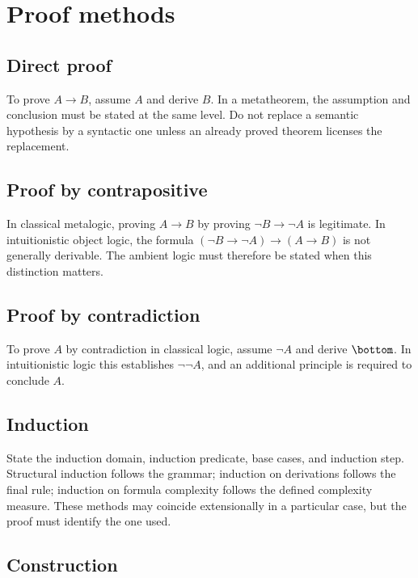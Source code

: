 \section{Proof methods}
\label{sec:writing-foundations-04}

\subsection{Direct proof}

To prove \(A\to B\), assume \(A\) and derive \(B\).  In a metatheorem, the
assumption and conclusion must be stated at the same level.  Do not replace a
semantic hypothesis by a syntactic one unless an already proved theorem
licenses the replacement.

\subsection{Proof by contrapositive}

In classical metalogic, proving \(A\to B\) by proving
\(\neg B\to\neg A\) is legitimate.  In intuitionistic object logic, the
formula \((\neg B\to\neg A)\to(A\to B)\) is not generally derivable.  The
ambient logic must therefore be stated when this distinction matters.

\subsection{Proof by contradiction}

To prove \(A\) by contradiction in classical logic, assume \(\neg A\) and
derive \(\bottom\).  In intuitionistic logic this establishes
\(\neg\neg A\), and an additional principle is required to conclude \(A\).

\subsection{Induction}

State the induction domain, induction predicate, base cases, and induction
step.  Structural induction follows the grammar; induction on derivations
follows the final rule; induction on formula complexity follows the defined
complexity measure.  These methods may coincide extensionally in a particular
case, but the proof must identify the one used.

\subsection{Construction}

